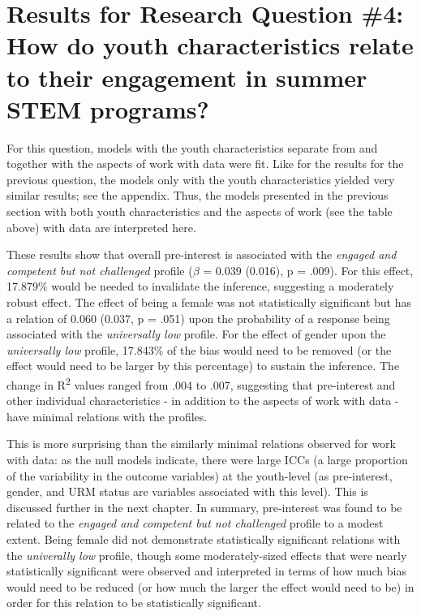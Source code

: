 \documentclass[]{msu-thesis}
\theoremstyle{definition}
\theoremstyle{definition}
\theoremstyle{definition}
\theoremstyle{remark}
\begin{document}
\section{Results for Research Question \#4: How do youth characteristics
relate to their engagement in summer STEM
programs?}\label{results-for-research-question-4-how-do-youth-characteristics-relate-to-their-engagement-in-summer-stem-programs}

For this question, models with the youth characteristics separate from
and together with the aspects of work with data were fit. Like for the
results for the previous question, the models only with the youth
characteristics yielded very similar results; see the appendix. Thus,
the models presented in the previous section with both youth
characteristics and the aspects of work (see the table above) with data
are interpreted here.

These results show that overall pre-interest is associated with the
\emph{engaged and competent but not challenged} profile (\(\beta\) =
0.039 (0.016), p = .009). For this effect, 17.879\% would be needed to
invalidate the inference, suggesting a moderately robust effect. The
effect of being a female was not statistically significant but has a
relation of 0.060 (0.037, p = .051) upon the probability of a response
being associated with the \emph{universally low} profile. For the effect
of gender upon the \emph{universally low} profile, 17.843\% of the bias
would need to be removed (or the effect would need to be larger by this
percentage) to sustain the inference. The change in R\textsuperscript{2}
values ranged from .004 to .007, suggesting that pre-interest and other
individual characteristics - in addition to the aspects of work with
data - have minimal relations with the profiles.

This is more surprising than the similarly minimal relations observed
for work with data: as the null models indicate, there were large ICCs
(a large proportion of the variability in the outcome variables) at the
youth-level (as pre-interest, gender, and URM status are variables
associated with this level). This is discussed further in the next
chapter. In summary, pre-interest was found to be related to the
\emph{engaged and competent but not challenged} profile to a modest
extent. Being female did not demonstrate statistically significant
relations with the \emph{univerally low} profile, though some
moderately-sized effects that were nearly statistically significant were
observed and interpreted in terms of how much bias would need to be
reduced (or how much the larger the effect would need to be) in order
for this relation to be statistically significant.
\end{document}
